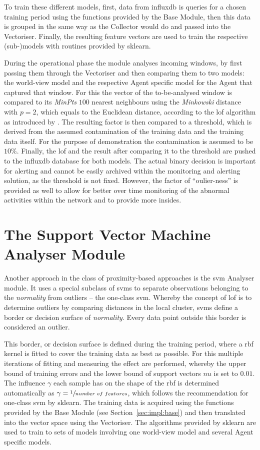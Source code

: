 To train these different models, first, data from \gls{influxdb} is queries for a chosen training period using the functions provided by the Base Module, then this data is grouped in the same way as the Collector would do and passed into the Vectoriser.
Finally, the resulting feature vectors are used to train the respective (sub-)models with routines provided by \gls{sklearn}.

During the operational phase the module analyses incoming windows, by first passing them through the Vectoriser and then comparing them to two models: the world-view model and the respective Agent specific model for the Agent that captured that window.
For this the vector of the to-be-analysed window is compared to its \emph{MinPts} $100$ nearest neighbours using the \emph{Minkowski} distance with $p=2$, which equals to the Euclidean distance, according to the \gls{lof} algorithm as introduced by \textcite{Breunig2000}.
The resulting factor is then compared to a threshold, which is derived from the assumed contamination of the training data and the training data itself. For the purpose of demonstration the contamination is assumed to be $10\%$.
Finally, the \gls{lof} and the result after comparing it to the threshold are pushed to the \gls{influxdb} database for both models.
The actual binary decision is important for alerting and cannot be easily archived within the monitoring and alerting solution, as the threshold is not fixed.
However, the factor of \enquote{oulier-ness} is provided as well to allow for better over time monitoring of the abnormal activities within the network and to provide more insides.

\section{The Support Vector Machine Analyser Module}
\label{sec:impl:svm}

Another approach in the class of proximity-based approaches is the \gls{svm} Analyser module. It uses a special subclass of \glspl{svm}
to separate observations belonging to the \emph{normality} from outliers -- the one-class \gls{svm}.
Whereby the concept of \gls{lof} is to determine outliers by comparing distances in the local cluster, \glspl{svm} define a border or decision surface of \emph{normality}. Every data point outside this border is considered an outlier.

This border, or decision surface is defined during the training period, where a \gls{rbf} kernel is fitted to cover the training data as best as possible. For this multiple iterations of fitting and measuring the effect are performed, whereby the upper bound of training errors and the lower bound of support vectors $nu$ is set to $0.01$. The influence $\gamma$ each sample has on the shape of the \gls{rbf} is determined automatically as \(\gamma = \sfrac{1}{number\ of\ features}\), which follows the recommendation for one-class \gls{svm} by \gls{sklearn}.
The training data is acquired using the functions provided by the Base Module (see Section~\ref{sec:impl:base}) and then translated into the vector space using the Vectoriser.
The algorithms provided by \gls{sklearn} are used to train to sets of models involving one world-view model and several Agent specific models.

